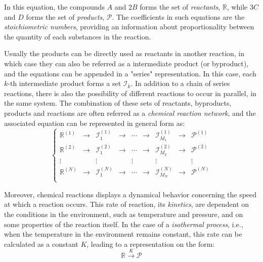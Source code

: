 \documentclass[a4paper,11pt]{book}
\numberwithin{figure}{chapter}
\numberwithin{equation}{chapter}
\numberwithin{table}{chapter}
\theoremstyle{definition}
\begin{document}
In this equation, the compounds $A$ and $2 B$ forms the set of \textit{reactants}, $\mathbb{R}$, while $3 C$ and $D$ forms the set of \textit{products}, $\mathcal{P}$. The coefficients in such equations are the \textit{stoichiometric numbers}, providing an information about proportionality between the quantity of each substances in the reaction. 

Usually the products can be directly used as reactants in another reaction, in which case they can also be referred as a intermediate product (or byproduct), and the equations can be appended in a "series" representation. In this case, each $k$-th intermediate product forms a set $\mathcal{I}_k$. In addition to a chain of series reactions, there is also the possibility of different reactions to occur in parallel, in the same system. The combination of these sets of reactants, byproducts, products and reactions are often referred as a \textit{chemical reaction network}, and the associated equation can be represented in general form as:
\begin{equation} \label{eq:chemNetwork}
\left\{ \begin{matrix}
    \mathbb{R}^{(1)}  & \longrightarrow & \mathcal{I}^{(1)}_1  &  \longrightarrow & \cdots & \longrightarrow & \mathcal{I}^{(1)}_{M_1} & \longrightarrow & \mathcal{P}^{(1)} \\
    \mathbb{R}^{(2)} & \longrightarrow & \mathcal{I}^{(2)}_1  &  \longrightarrow & \cdots & \longrightarrow & \mathcal{I}^{(2)}_{M_2} & \longrightarrow & \mathcal{P}^{(2)} \\
    \vdots &  & \vdots &  & \vdots &  & \vdots &  & \vdots \\
    \mathbb{R}^{(N)} & \longrightarrow & \mathcal{I}^{(N)}_1  &  \longrightarrow & \cdots & \longrightarrow & \mathcal{I}^{(N)}_{M_N} & \longrightarrow & \mathcal{P}^{(N)} \\
\end{matrix} \right.
\end{equation} 

Moreover, chemical reactions displays a dynamical behavior concerning the speed at which a reaction occurs. This rate of reaction, its \textit{kinetics}, are dependent on the conditions in the environment, such as temperature and pressure, and on some properties of the reaction itself. In the case of a \textit{isothermal process}, i.e., when the temperature in the environment remains constant, this rate can be calculated as a constant $K$, leading to a representation on the form:
\begin{equation}
    \mathbb{R} \overset{K}{\longrightarrow} \mathcal{P}
\end{equation} 
\end{document}
